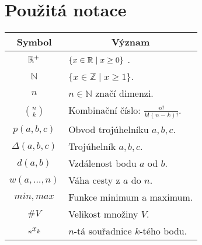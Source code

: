 \chapter*{Použitá notace}
\label{sec:notace}
\noindent
\begin{table}[h]
  \centering
  \begin{tabular}{c l}
    Symbol             & \multicolumn{1}{c}{Význam}               \\
    \toprule
    $\mathbb{R}^+$             & $\{ x \in \mathbb{R} \mid x \geq 0 \}$ .         \\
    $\mathbb{N}$       &$\{ x \in \mathbb{Z} \mid x \geq 1 \} $.  \\
    $n$                & $n \in \mathbb{N}$ značí dimenzi.        \\
    $ \binom{n}{k}$    & Kombinační číslo: $\frac{n!}{k!(n-k)!}$. \\
    $ p(a, b, c)$      & Obvod trojúhelníku $a, b, c$.            \\
    $\Delta(a,b,c)$    & Trojúhelník $a, b, c$.                   \\
    $ d(a, b)$         & Vzdálenost bodu $a$ od $b$.              \\
    $ w(a, \ldots, n)$ & Váha cesty z $a$ do $n$.                 \\
    $min, max$         & Funkce minimum a maximum.                \\
    $ \#V $            & Velikost množiny $V$.                    \\
    $\x{n}{k}$         & $n$-tá souřadnice $k$-tého bodu.
  \end{tabular}
\end{table}